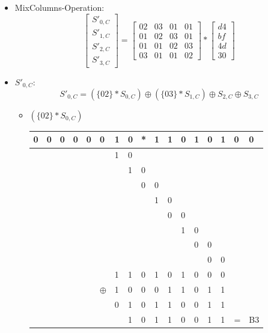 \begin{itemize}
     \item MixColumns-Operation:
     \begin{equation}
         \begin{bmatrix}
             S'_{0,C}\\
             S'_{1,C}\\
             S'_{2,C}\\
             S'_{3,C}
         \end{bmatrix}
         =
         \begin{bmatrix}
             02 & 03 & 01 & 01\\
             01 & 02 & 03 & 01\\
             01 & 01 & 02 & 03\\
             03 & 01 & 01 & 02
         \end{bmatrix}
         *
         \begin{bmatrix}
             d4\\
             bf\\
             4d\\
             30
         \end{bmatrix}
     \end{equation}

     \item $S'_{0,C}$:
     \begin{equation}
         S'_{0,C} = (\{02\} * S_{0,C}) \oplus (\{03\} * S_{1,C}) \oplus S_{2,C} \oplus S_{3,C}
     \end{equation}

     \begin{itemize}
         \item $(\{02\} * S_{0,C})$

\begin{center}
\begin{tabular}{lllllllllllllllll}
0 & 0 & 0 & 0 & 0 & 0 & 1 & 0 & * & 1 & 1 & 0 & 1 & 0 & 1 & 0 & 0\\
\hline
 &  &  &  &  &  & 1 & 0 &  &  &  &  &  &  &  &  & \\
 &  &  &  &  &  &  & 1 & 0 &  &  &  &  &  &  &  & \\
 &  &  &  &  &  &  &  & 0 & 0 &  &  &  &  &  &  & \\
 &  &  &  &  &  &  &  &  & 1 & 0 &  &  &  &  &  & \\
 &  &  &  &  &  &  &  &  &  & 0 & 0 &  &  &  &  & \\
 &  &  &  &  &  &  &  &  &  &  & 1 & 0 &  &  &  & \\
 &  &  &  &  &  &  &  &  &  &  &  & 0 & 0 &  &  & \\
 &  &  &  &  &  &  &  &  &  &  &  &  & 0 & 0 &  & \\
 \hline
 &  &  &  &  &  & 1 & 1 & 0 & 1 & 0 & 1 & 0 & 0 & 0 &  & \\
 &  &  &  &  & $\oplus$ & 1 & 0 & 0 & 0 & 1 & 1 & 0 & 1 & 1 &  & \\
 \hline
 &  &  &  &  &  & 0 & 1 & 0 & 1 & 1 & 0 & 0 & 1 & 1 &  & \\
 &  &  &  &  &  &  & 1 & 0 & 1 & 1 & 0 & 0 & 1 & 1 & = & B3
         \end{tabular}
         \end{center}


\end{itemize}
\end{itemize}
